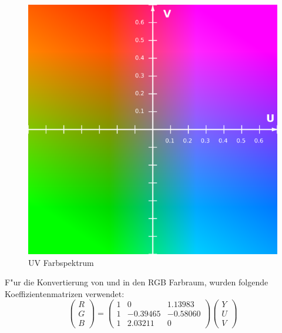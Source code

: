 \documentclass[a4paper]{article}
\begin{document}
\begin{figure}[htp]
\centering
\includegraphics[scale=0.40]{600px-YUV-UV_Scaled_Y05_70_percent.png}
\caption{UV Farbspektrum}
\label{UVFarbspektrum}
\end{figure}

F"ur die Konvertierung von und in den RGB Farbraum, wurden folgende Koeffizientenmatrizen verwendet:
\begin{equation}
\label{YUV_to_RGB}
\begin{pmatrix} R \\ G \\ B\end{pmatrix} = 
\begin{pmatrix}
	1 & 0 & 1.13983 \\ 
	1 & -0.39465 & -0.58060 \\ 
	1 & 2.03211 & 0
\end{pmatrix} 
\begin{pmatrix}Y \\ U \\ V\end{pmatrix}
\end{equation}
\end{document}
